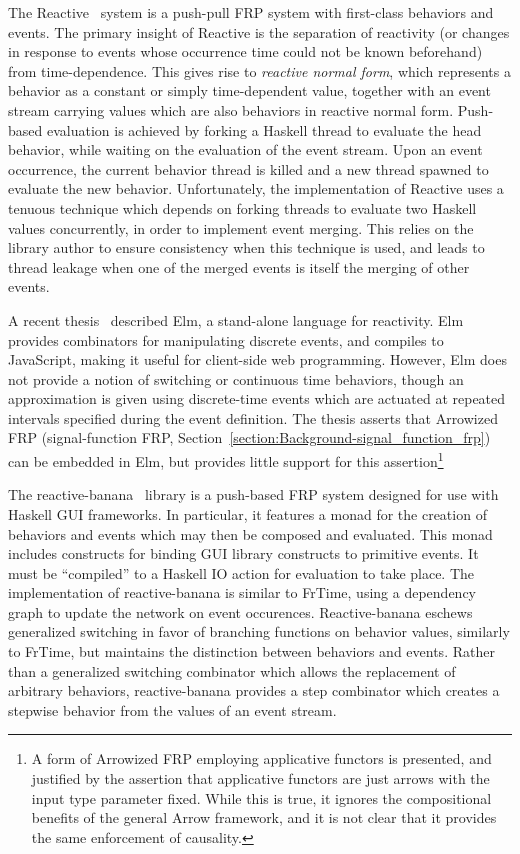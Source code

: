 The Reactive~\cite{Elliott2009} system is a push-pull FRP system with
first-class behaviors and events. The primary insight of Reactive is the
separation of reactivity (or changes in response to events whose occurrence time
could not be known beforehand) from time-dependence. This gives rise to {\em
reactive normal form}, which represents a behavior as a constant or simply
time-dependent value, together with an event stream carrying values which are also
behaviors in reactive normal form. Push-based evaluation is achieved by forking
a Haskell thread to evaluate the head behavior, while waiting on the evaluation
of the event stream. Upon an event occurrence, the current behavior thread is
killed and a new thread spawned to evaluate the new behavior. Unfortunately, the
implementation of Reactive uses a tenuous technique which depends on forking
threads to evaluate two Haskell values concurrently, in order to implement event
merging. This relies on the library author to ensure consistency when this
technique is used, and leads to thread leakage when one of the merged events is
itself the merging of other events.

A recent thesis~\cite{Czaplicki2012} described Elm, a stand-alone language for
reactivity. Elm provides combinators for manipulating discrete events, and
compiles to JavaScript, making it useful for client-side web programming.
However, Elm does not provide a notion of switching or continuous time
behaviors, though an approximation is given using discrete-time events which are
actuated at repeated intervals specified during the event definition. The thesis
asserts that Arrowized FRP (signal-function FRP, Section~\ref{section:Background-signal_function_frp})
can be embedded in Elm, but provides little support for this assertion\footnote{
A form of Arrowized FRP employing applicative functors is presented, and
justified by the assertion that applicative functors are just arrows with the
input type parameter fixed. While this is true, it ignores the compositional
benefits of the general Arrow framework, and it is not clear that it provides
the same enforcement of causality.}

The reactive-banana~\cite{Apfelmus} library is a push-based FRP system designed
for use with Haskell GUI frameworks. In particular, it features a monad for
the creation of behaviors and events which may then be composed and evaluated.
This monad includes constructs for binding GUI library constructs to primitive
events. It must be ``compiled'' to a Haskell IO action for evaluation to take
place. The implementation of reactive-banana is similar to FrTime, using a
dependency graph to update the network on event occurences. Reactive-banana
eschews generalized switching in favor of branching functions on behavior
values, similarly to FrTime, but maintains the distinction between behaviors and
events. Rather than a generalized switching combinator which allows the
replacement of arbitrary behaviors, reactive-banana provides a step combinator
which creates a stepwise behavior from the values of an event stream.

